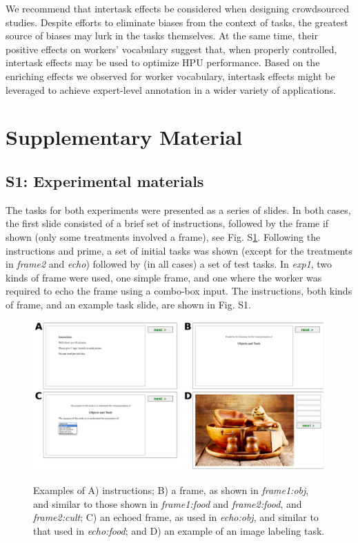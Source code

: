 \documentclass[12pt]{article}
\begin{document}
We recommend that intertask effects be considered when designing crowdsourced
studies.  Despite efforts to eliminate biases from the context of tasks,
the greatest source of biases may lurk in the tasks themselves.
At the same time, their positive effects on workers' vocabulary suggest 
that, when properly controlled, intertask effects may be
used to optimize HPU performance.  Based on the enriching effects we observed
for worker vocabulary, intertask effects might be leveraged to achieve 
expert-level annotation in a wider variety of applications.





\section*{Supplementary Material}

\subsection*{S1: Experimental materials}
The tasks for both experiments were presented as a series of slides.  In
both cases, the first slide consisted of a brief set of instructions, followed
by the frame if shown (only some treatments involved a frame), see 
Fig. S\ref{fig:hit_preamble}.  Following the instructions and prime, a set
of initial tasks was shown (except for the treatments in \textit{frame2}
and \textit{echo}) followed by (in all cases) a set of test tasks.  In
\textit{exp1}, two kinds of frame were used, one simple frame, and one where
the worker was required to echo the frame using a combo-box input.  The
instructions, both kinds of frame, and an example task slide, are shown 
in Fig. S1.
\begin{figure}
	\includegraphics[scale=0.8]{figs/tasks.pdf}
	\label{fig:hit_preamble}
	\caption{Examples of A) instructions; B) a frame, as shown in 
		\textit{frame1:obj}, and similar to those shown in 
		\textit{frame1:food} and \textit{frame2:food}, and 
		\textit{frame2:cult};  
		C) an echoed frame, as used in \textit{echo:obj}, and similar to that
		used in \textit{echo:food}; and D) an 
		example of an image labeling task.
	}
\end{figure}
\end{document}

